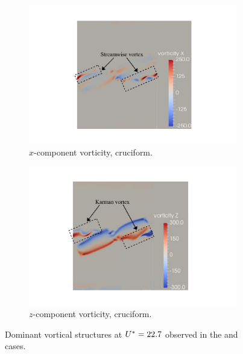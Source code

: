 \documentclass[oneside]{utmthesis}
\begin{document}
\begin{figure}
  \centering
  \begin{subfigure}[h]{1\textwidth}
    \centering
    \includegraphics[width=\textwidth]{figs/vorx225}
    \caption{$x$-component vorticity, \angfo{} cruciform.}
    \label{fig:vorx225}
  \end{subfigure}

  \begin{subfigure}[h]{1\textwidth}
    \centering
    \includegraphics[width=\textwidth]{figs/vorz225}
    \caption{$z$-component vorticity, \angfo{} cruciform.}
    \label{fig:vorz225}
  \end{subfigure}
  \caption{Dominant vortical structures at $U^{*} = 22.7$ observed in the \angtw{} and \angon{} cases.}
\end{figure}
\end{document}
